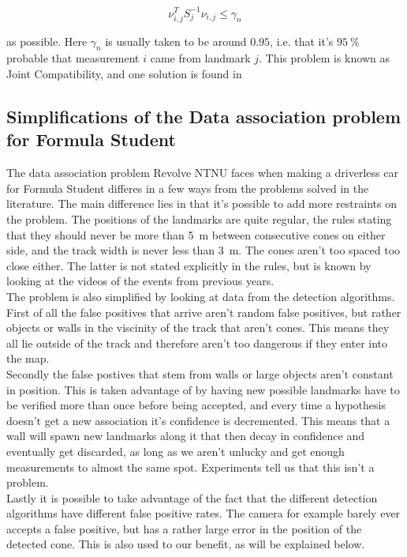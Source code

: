 \begin{equation}
    \nu_{i,j}^TS_j^{-1}\nu_{i,j} \leq \gamma_n
\end{equation}

as possible. Here $\gamma_n$ is usually taken to be around $0.95$, i.e. that it's $\SI{95}{\percent}$ probable that measurement $i$ came from landmark $j$. This problem is known as Joint Compatibility, and one solution is found in \cite{Bailey}

\subsection{Simplifications of the Data association problem for Formula Student}

The data association problem Revolve NTNU faces when making a driverless car for Formula Student differes in a few ways from the problems solved in the literature. The main difference lies in that it's possible to add more restraints on the problem. The positions of the landmarks are quite regular, the rules stating that they should never be more than \SI{5}{\meter} between consecutive cones on either side, and the track width is never less than \SI{3}{\meter}. The cones aren't too spaced too close either. The latter is not stated explicitly in the rules, but is known by looking at the videos of the events from previous years. \\ 

The problem is also simplified by looking at data from the detection algorithms. First of all the false positives that arrive aren't random false positives, but rather objects or walls in the viscinity of the track that aren't cones. This means they all lie outside of the track and therefore aren't too dangerous if they enter into the map. \\

Secondly the false postives that stem from walls or large objects aren't constant in position. This is taken advantage of by having new possible landmarks have to be verified more than once before being accepted, and every time a hypothesis doesn't get a new association it's confidence is decremented. This means that a wall will spawn new landmarks along it that then decay in confidence and eventually get discarded, as long as we aren't unlucky and get enough measurements to almost the same spot. Experiments tell us that this isn't a problem. \\ 

Lastly it is possible to take advantage of the fact that the different detection algorithms have different false positive rates. The camera for example barely ever accepts a false positive, but has a rather large error in the position of the detected cone. This is also used to our benefit, as will be explained below. 
